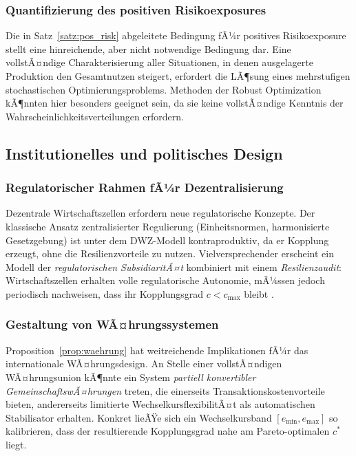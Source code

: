 ﻿\documentclass[a4paper,12pt]{article}
\theoremstyle{definition}
\begin{document}
\subsubsection{Quantifizierung des positiven Risikoexposures}

Die in Satz~\ref{satz:pos_risk} abgeleitete Bedingung fÃ¼r positives Risikoexposure stellt
eine hinreichende, aber nicht notwendige Bedingung dar. Eine vollstÃ¤ndige Charakterisierung
aller Situationen, in denen ausgelagerte Produktion den Gesamtnutzen steigert, erfordert
die LÃ¶sung eines mehrstufigen stochastischen Optimierungsproblems. Methoden der Robust
Optimization \citep{ben2009robust} kÃ¶nnten hier besonders geeignet sein, da sie keine
vollstÃ¤ndige Kenntnis der Wahrscheinlichkeitsverteilungen erfordern.

\subsection{Institutionelles und politisches Design}

\subsubsection{Regulatorischer Rahmen fÃ¼r Dezentralisierung}

Dezentrale Wirtschaftszellen erfordern neue regulatorische Konzepte. Der klassische
Ansatz zentralisierter Regulierung (Einheitsnormen, harmonisierte Gesetzgebung) ist
unter dem DWZ-Modell kontraproduktiv, da er Kopplung erzeugt, ohne die Resilienzvorteile
zu nutzen. Vielversprechender erscheint ein Modell der \emph{regulatorischen SubsidiaritÃ¤t}
kombiniert mit einem \emph{Resilienzaudit}: Wirtschaftszellen erhalten volle regulatorische
Autonomie, mÃ¼ssen jedoch periodisch nachweisen, dass ihr Kopplungsgrad $c < c_{\text{max}}$
bleibt \citep{ostrom1990governing}.

\subsubsection{Gestaltung von WÃ¤hrungssystemen}

Proposition~\ref{prop:waehrung} hat weitreichende Implikationen fÃ¼r das internationale
WÃ¤hrungsdesign. An Stelle einer vollstÃ¤ndigen WÃ¤hrungsunion kÃ¶nnte ein System \emph{partiell
konvertibler GemeinschaftswÃ¤hrungen} treten, die einerseits Transaktionskostenvorteile
bieten, andererseits limitierte WechselkursflexibilitÃ¤t als automatischen Stabilisator
erhalten. Konkret lieÃŸe sich ein Wechselkursband $[e_{\min}, e_{\max}]$ so kalibrieren,
dass der resultierende Kopplungsgrad nahe am Pareto-optimalen $c^*$ liegt.
\end{document}
